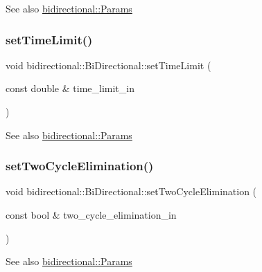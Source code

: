 \begin{DoxySeeAlso}{See also}
\hyperlink{classbidirectional_1_1Params}{bidirectional\+::\+Params} 
\end{DoxySeeAlso}
\mbox{\label{classbidirectional_1_1BiDirectional_af21bde5b9190abb4f0ea10ef3f8b30b4}} 
\subsubsection{\texorpdfstring{set\+Time\+Limit()}{setTimeLimit()}}
{\footnotesize\ttfamily void bidirectional\+::\+Bi\+Directional\+::set\+Time\+Limit (\begin{DoxyParamCaption}\item[{const double \&}]{time\+\_\+limit\+\_\+in }\end{DoxyParamCaption})\hspace{0.3cm}{\ttfamily [inline]}}

\begin{DoxySeeAlso}{See also}
\hyperlink{classbidirectional_1_1Params}{bidirectional\+::\+Params} 
\end{DoxySeeAlso}
\mbox{\label{classbidirectional_1_1BiDirectional_adc4255b9f2ad9c9271805a64f93ea7c9}} 
\subsubsection{\texorpdfstring{set\+Two\+Cycle\+Elimination()}{setTwoCycleElimination()}}
{\footnotesize\ttfamily void bidirectional\+::\+Bi\+Directional\+::set\+Two\+Cycle\+Elimination (\begin{DoxyParamCaption}\item[{const bool \&}]{two\+\_\+cycle\+\_\+elimination\+\_\+in }\end{DoxyParamCaption})\hspace{0.3cm}{\ttfamily [inline]}}

\begin{DoxySeeAlso}{See also}
\hyperlink{classbidirectional_1_1Params}{bidirectional\+::\+Params} 
\end{DoxySeeAlso}


